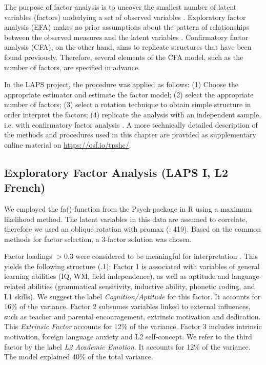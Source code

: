 \documentclass[output=paper]{langsci/langscibook}
\begin{document}
The purpose of factor analysis is to uncover the smallest number of latent variables (factors) underlying a set of observed variables \citep{Brown2006}. Exploratory factor analysis (EFA) makes no prior assumptions about the pattern of relationships between the observed measures and the latent variables \citep{Brown2006}. Confirmatory factor analysis (CFA), on the other hand, aims to replicate structures that have been found previously. Therefore, several elements of the CFA model, such as the number of factors, are specified in advance.

In the LAPS project, the procedure was applied as follows: (1) Choose the appropriate estimator and estimate the factor model; (2) select the appropriate number of factors; (3) select a rotation technique to obtain simple structure in order interpret the factors; (4) replicate the analysis with an independent sample, i.e. with confirmatory factor analysis \citep{Brown2006}. A more technically detailed description of the methods and procedures used in this chapter are provided as supplementary online material on \url{https://osf.io/tpshc/}.

\subsection{Exploratory Factor Analysis (LAPS I, L2 French)}

We employed the fa()-function from the Psych-package in R \citep{Revelle2018} using a maximum likelihood method. The latent variables in this data are assumed to correlate, therefore we used an oblique rotation with promax (\citealt{BortzSchuster2010}: 419). Based on the common methods for factor selection, a 3-factor solution was chosen. 



Factor loadings $> 0.3$ were considered to be meaningful for interpretation \citep[30]{Brown2006}. This yields the following structure (.1): Factor 1 is associated with variables of general learning abilities (IQ, WM, field independence), as well as aptitude and language-related abilities (grammatical sensitivity, inductive ability, phonetic coding, and L1 skills). We suggest the label \textit{Cognition/Aptitude} for this factor. It accounts for 16\% of the variance. Factor 2 subsumes variables linked to external influences, such as teacher and parental encouragement, extrinsic motivation and dedication. This \textit{Extrinsic Factor} accounts for 12\% of the variance. Factor 3 includes intrinsic motivation, foreign language anxiety and L2 self-concept. We refer to the third factor by the label \textit{L2 Academic Emotion}. It accounts for 12\% of the variance. The model explained 40\% of the total variance. 
\end{document}
